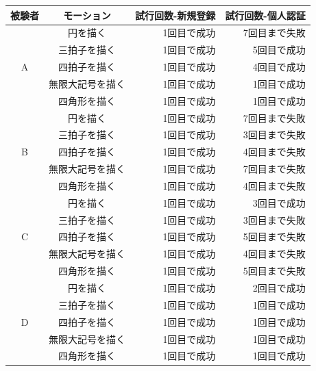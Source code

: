\documentclass[12pt]{jreport}
\begin{document}
        \begin{center}
            \begin{longtable}{|c|c|r|r|}
            \hline
                被験者 & モーション & 試行回数-新規登録 & 試行回数-個人認証 \\ \hline \hline \endhead
                  & 円を描く & 1回目で成功 & 7回目まで失敗 \\ \cline{2-4} %
                  & 三拍子を描く & 1回目で成功 & 5回目で成功 \\ \cline{2-4}
                A & 四拍子を描く & 1回目で成功 & 4回目で成功 \\ \cline{2-4}
                  & 無限大記号を描く & 1回目で成功 & 1回目で成功 \\ \cline{2-4}
                  & 四角形を描く & 1回目で成功 & 1回目で成功 \\ \hline %
                  & 円を描く & 1回目で成功 & 7回目まで失敗 \\ \cline{2-4} %
                  & 三拍子を描く & 1回目で成功 & 3回目まで失敗 \\ \cline{2-4}
                B & 四拍子を描く & 1回目で成功 & 4回目まで失敗 \\ \cline{2-4}
                  & 無限大記号を描く & 1回目で成功 & 7回目まで失敗 \\ \cline{2-4}
                  & 四角形を描く & 1回目で成功 & 4回目まで失敗 \\ \hline %
                  & 円を描く & 1回目で成功 & 3回目で成功 \\ \cline{2-4} %
                  & 三拍子を描く & 1回目で成功 & 3回目まで失敗 \\ \cline{2-4}
                C & 四拍子を描く & 1回目で成功 & 5回目まで失敗 \\ \cline{2-4}
                  & 無限大記号を描く & 1回目で成功 & 4回目まで失敗 \\ \cline{2-4}
                  & 四角形を描く & 1回目で成功 & 5回目まで失敗 \\ \hline %
                  & 円を描く & 1回目で成功 & 2回目で成功 \\ \cline{2-4} %
                  & 三拍子を描く & 1回目で成功 & 1回目で成功 \\ \cline{2-4}
                D & 四拍子を描く & 1回目で成功 & 1回目で成功 \\ \cline{2-4}
                  & 無限大記号を描く & 1回目で成功 & 1回目で成功 \\ \cline{2-4}
                  & 四角形を描く & 1回目で成功 & 1回目で成功 \\ \hline %

\end{longtable}
\end{center}
\end{document}
